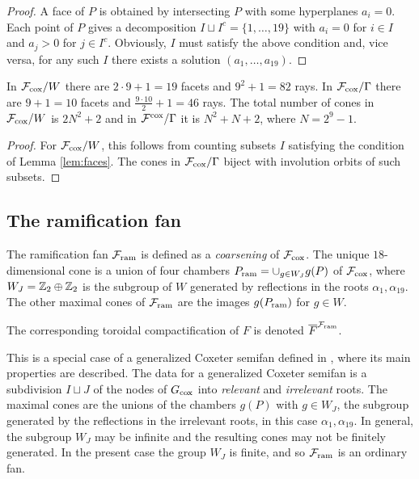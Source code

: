 \documentclass[table,x11names]{amsart}
\begin{document}
 \begin{proof}
   A face of $P$ is obtained by intersecting $P$ with some hyperplanes
   $a_i=0$.  Each point of $P$ gives a decomposition
   $I\sqcup I^c = \{1,\dotsc,19\}$ with $a_i=0$ for $i\in I$ and
   $a_j>0$ for $j\in I^c$. Obviously, $I$ must satisfy the above
   condition and, vice versa, for any such $I$ there exists a solution
   $(a_1,\dotsc,a_{19})$. 
 \end{proof}

\begin{corollary}
  In ${\mathcal F}_{\rm cox}/W$ there are $2\cdot 9+1=19$ facets and $9^2+1=82$
  rays. In ${\mathcal F}_{\rm cox}/\Gamma$ there are $9+1=10$ facets and
  $\frac{9\cdot 10}{2}+1=46$ rays. The total number of cones in
  ${\mathcal F}_{\rm cox}/W$ is $2N^2+2$ and in ${\mathcal F}^{\rm cox}/\Gamma$ it is $N^2+N+2$, where
  $N=2^9-1$. 
\end{corollary}

 \begin{proof}
For ${\mathcal F}_{\rm cox}/W$, this follows from counting subsets $I$ satisfying the condition
of Lemma \ref{lem:faces}.
The cones in ${\mathcal F}_{\rm cox}/\Gamma$ biject with involution orbits of such subsets.
 \end{proof}

\subsection{The ramification fan}
\label{sec:coxeter-semifan}

\begin{definition}
  The ramification fan ${\mathcal F}_{\rm ram}$ is defined as a \emph{coarsening} of
  ${\mathcal F}_{\rm cox}$. The unique $18$-dimensional cone is a union of four
  chambers $P_{\rm ram} = \cup_{g\in W_J} g(P)$ of ${\mathcal F}_{\rm cox}$, where
  $W_J = {\mathbb Z}_2\oplus{\mathbb Z}_2$ is the subgroup of $W$ generated by 
  reflections in the roots $\alpha_1,\alpha_{19}$. The other maximal
  cones of ${\mathcal F}_{\rm ram}$ are the images $g(P_{\rm ram})$ for $g\in W$.

  The corresponding toroidal compactification of $F$ is denoted
  ${\overline F}^{{\mathcal F}_{\rm ram}}$.
\end{definition}

This is a special case of a generalized Coxeter semifan defined in
\cite[Sec. 10C]{alexeev2019stable-pair}, where its main properties are
described. The data for a generalized Coxeter semifan is a subdivision
$I\sqcup J$ of the nodes of $G_{\rm cox}$ into \emph{relevant} and
\emph{irrelevant} roots.  The maximal cones are the unions of the
chambers $g(P)$ with $g\in W_J$, the subgroup generated by the
reflections in the irrelevant roots, in this case
$\alpha_1,\alpha_{19}$. In general, the subgroup $W_J$ may be infinite
and the resulting cones may not be finitely generated.  In the present
case the group $W_J$ is finite, and so ${\mathcal F}_{\rm ram}$ is an ordinary fan.
\end{document}
